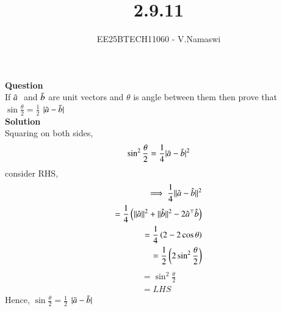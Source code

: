\documentclass[journal]{IEEEtran}
\begin{document}

\vspace{3cm}

\title{2.9.11}
\author{EE25BTECH11060 - V.Namaswi}
{\let\newpage\relax\maketitle}
\renewcommand{\thefigure}{\theenumi}
\renewcommand{\thetable}{\theenumi}
\setlength{\intextsep}{10pt} %
\textbf{Question}\\If $\Bar{a} \;$ and \;$ \Bar{b} $ are unit vectors and $\theta$ is angle between them then prove that $\sin\frac{\theta}{2}=\frac{1}{2}$ $| {\Bar{a}-\Bar{b}}|$\\
\textbf{Solution}\\Squaring on both sides,\\
\begin{align*}
    \sin^2\frac{\theta}{2}=\frac{1}{4}| {\Bar{a}-\Bar{b}}|^2\\
    \end{align*}
  consider RHS,\\
\begin{align}
 \implies \frac{1}{4}|| {\hat{a}-\hat{b}}||^2\\
  =\frac{1}{4} \left(||\hat{a}||^2+||\hat{b}||^2-2\hat{a}^\top\hat{b}\right)\\
  =\frac{1}{4}\left(2-2\cos \theta\right)\\
  =\frac{1}{2}\left(2\sin^2{\frac{\theta}{2}}\right)\\
  \end{align}
  \begin{align}
=\sin^2\frac{\theta}{2}\\
=LHS
\end{align}
Hence, $\sin\frac{\theta}{2}=\frac{1}{2}$  $| {\Bar{a}-\Bar{b}}|
$ 
\end{document}
